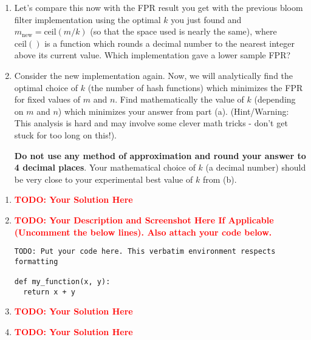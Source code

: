 \documentclass[12pt]{article}
\def\todo#1{\textcolor{red}{\textbf{#1}}}
\renewcommand{\|}{\mid}
\begin{document}
\begin{enumerate}
\begin{enumerate}
    \item Let's compare this now with the FPR result you get with the previous bloom filter implementation using the optimal $k$ you just found and $m_{\text{new}} = \text{ceil}(m/ k)$ (so that the space used is nearly the same), where $\text{ceil}()$ is a function which rounds a decimal number to the nearest integer above its current value.  Which implementation gave a lower sample FPR?
    
    \item Consider the new implementation again. Now, we will analytically find the optimal choice of $k$ (the number of hash functions) which minimizes the FPR for fixed values of $m$ and $n$. Find mathematically the value of $k$ (depending on $m$ and $n$) which minimizes your answer from part (a). (Hint/Warning: This analysis is hard and may involve some clever math tricks - don't get stuck for too long on this!).
    
    \textbf{Do not use any method of approximation and round your answer to 4 decimal places}. Your mathematical choice of $k$ (a decimal number) should be very close to your experimental best value of $k$ from (b).
      \end{enumerate}

  \begin{tcolorbox}
  \begin{enumerate}
  \item \todo{TODO: Your Solution Here}
  \item \todo{TODO: Your Description and Screenshot Here If Applicable (Uncomment the below lines). Also attach your code below.} 
\begin{verbatim}
TODO: Put your code here. This verbatim environment respects formatting

def my_function(x, y):
  return x + y
\end{verbatim}
  \item \todo{TODO: Your Solution Here}
  \item \todo{TODO: Your Solution Here}
  \end{enumerate}
  \end{tcolorbox}


\end{enumerate}
\end{document}
